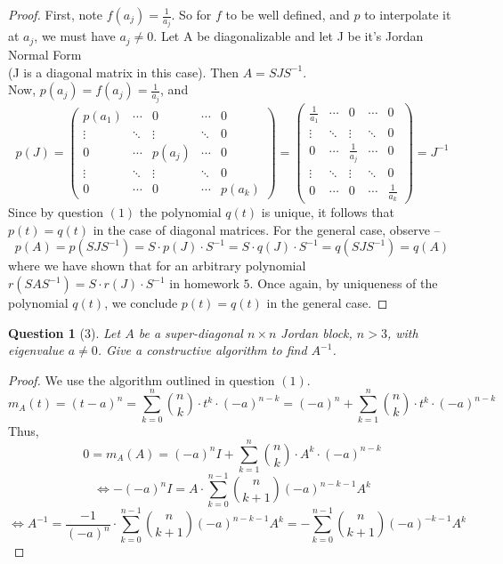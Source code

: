 \documentclass[11pt]{article}
\theoremstyle{quest}
\newtheorem*{question}{Question}
\begin{document}
\begin{proof}
First, note $f(a_j) = \frac{1}{a_j}$. So for $f$ to be well defined, and $p$ to interpolate it at $a_j$, we must have $a_j \ne 0$. Let A be diagonalizable and let J be it's Jordan Normal Form \\(J is a diagonal matrix in this case). Then $A = SJS^{-1}$. \\Now, $p(a_j) = f(a_j) = \frac{1}{a_j}$, and
$$p(J) = \begin{pmatrix}
p(a_1) & \cdots & 0 & \cdots & 0 \\
\vdots & \ddots & \vdots & \ddots  & 0 \\
0 & \cdots & p(a_j) & \cdots & 0 \\
\vdots & \ddots & \vdots & \ddots & 0 \\
0 & \cdots & 0 & \cdots & p(a_k)
\end{pmatrix} = \begin{pmatrix}
\frac{1}{a_1} & \cdots & 0 & \cdots & 0 \\
\vdots & \ddots & \vdots & \ddots  & 0 \\
0 & \cdots & \frac{1}{a_j} & \cdots & 0 \\
\vdots & \ddots & \vdots & \ddots & 0 \\
0 & \cdots & 0 & \cdots & \frac{1}{a_k}
\end{pmatrix} = J^{-1}$$
Since by question $(1)$ the polynomial $q(t)$ is unique, it follows that $p(t) = q(t)$ in the case of diagonal matrices. For the general case, observe --
$$p(A) = p(SJS^{-1}) = S\cdot p(J)\cdot S^{-1} = S\cdot q(J)\cdot S^{-1} = q(SJS^{-1}) = q(A)$$
where we have shown that for an arbitrary polynomial $r(SAS^{-1}) = S\cdot r(J)\cdot S^{-1}$ in homework $5$. Once again, by uniqueness of the polynomial $q(t)$, we conclude $p(t) = q(t)$ in the general case.
\end{proof}
\begin{question}[3]
Let $A$ be a super-diagonal $n \times n$ Jordan block, $n > 3$, with eigenvalue $a \ne 0$. Give a constructive algorithm to find $A^{-1}$.
\end{question}
\begin{proof}
We use the algorithm outlined in question $(1)$.
$$m_A(t) = (t-a)^n = \sum_{k=0}^n \binom{n}{k} \cdot t^k \cdot (-a)^{n-k} = (-a)^n + \sum_{k=1}^n \binom{n}{k} \cdot t^k \cdot (-a)^{n-k}$$
Thus,
$$0 = m_A(A) = (-a)^nI + \sum_{k=1}^n \binom{n}{k} \cdot A^k \cdot (-a)^{n-k}$$
$$\iff -(-a)^nI = A \cdot \sum_{k=0}^{n-1} \binom{n}{k+1} (-a)^{n-k-1} A^k$$
$$\iff A^{-1} = \frac{-1}{(-a)^n} \cdot \sum_{k=0}^{n-1} \binom{n}{k+1} (-a)^{n-k-1} A^k = - \sum_{k=0}^{n-1} \binom{n}{k+1}(-a)^{-k-1} A^k$$
\end{proof}
\end{document}
